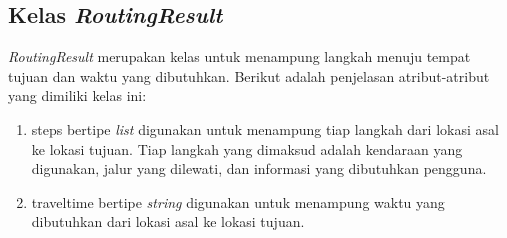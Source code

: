 \subsection{Kelas \textit{RoutingResult}}
\label{lab:Kelas RoutingResult}
\hspace{0.5cm} \textit{RoutingResult} merupakan kelas untuk menampung langkah menuju tempat tujuan dan waktu yang dibutuhkan. Berikut adalah penjelasan atribut-atribut yang dimiliki kelas ini:
\begin{enumerate}
	\item steps bertipe \textit{list} digunakan untuk menampung tiap langkah dari lokasi asal ke lokasi tujuan. Tiap langkah yang dimaksud adalah kendaraan yang digunakan, jalur yang dilewati, dan informasi yang dibutuhkan pengguna.
	\item traveltime bertipe \textit{string} digunakan untuk menampung waktu yang dibutuhkan dari lokasi asal ke lokasi tujuan.
\end{enumerate}

